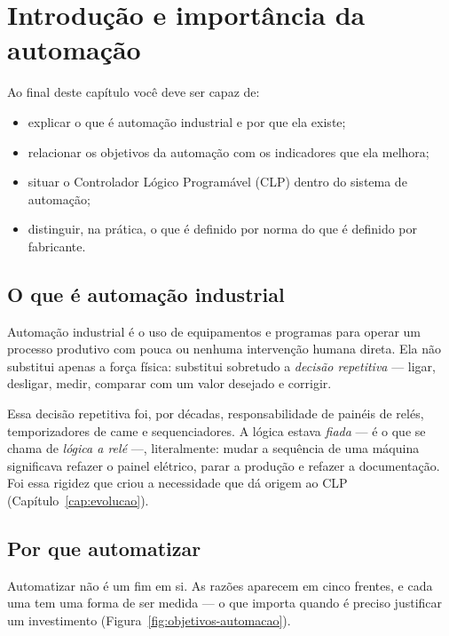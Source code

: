 \chapter{Introdução e importância da automação}
\label{cap:introducao}

\begin{objetivos}
Ao final deste capítulo você deve ser capaz de:
\begin{itemize}
  \item explicar o que é automação industrial e por que ela existe;
  \item relacionar os objetivos da automação com os indicadores que ela melhora;
  \item situar o Controlador Lógico Programável (CLP) dentro do sistema de automação;
  \item distinguir, na prática, o que é definido por norma do que é definido por fabricante.
\end{itemize}
\end{objetivos}

\section{O que é automação industrial}

Automação industrial é o uso de equipamentos e programas para operar um processo produtivo com
pouca ou nenhuma intervenção humana direta. Ela não substitui apenas a força física: substitui
sobretudo a \emph{decisão repetitiva} --- ligar, desligar, medir, comparar com um valor desejado e
corrigir.

Essa decisão repetitiva foi, por décadas, responsabilidade de painéis de relés, temporizadores de
came e sequenciadores. A lógica estava \emph{fiada} --- é o que se chama de \emph{lógica a relé} ---,
literalmente: mudar a sequência de uma máquina significava refazer o painel elétrico, parar a
produção e refazer a documentação. Foi essa rigidez que criou a necessidade que dá origem ao CLP
(Capítulo~\ref{cap:evolucao}).


\section{Por que automatizar}

Automatizar não é um fim em si. As razões aparecem em cinco frentes, e cada uma tem uma forma de
ser medida --- o que importa quando é preciso justificar um investimento
(Figura~\ref{fig:objetivos-automacao}).

